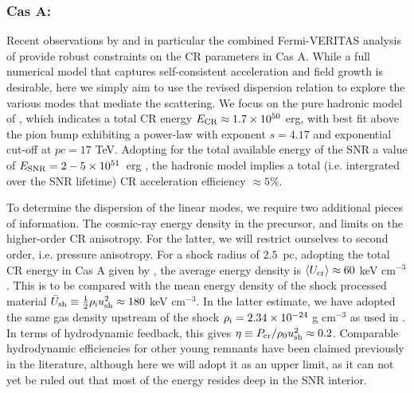 \documentclass[a4paper,fleqn,usenatbib]{mnras}
\begin{document}
\subsubsection*{Cas A:}

Recent observations by \cite{CasAMAGIC} and in particular the combined Fermi-VERITAS analysis of \cite{CasAVeritas} provide robust constraints on the CR parameters in Cas A. While a full numerical model that captures self-consistent acceleration and field growth is desirable, here we simply aim to use the revised dispersion relation to explore the various modes that mediate the scattering. We focus on the pure hadronic model of \citet{CasAVeritas}, which indicates a total CR energy $E_{\rm CR} \approx 1.7 \times 10^{50}$ erg, with best fit above the pion bump exhibiting a power-law with exponent $s=4.17$ and exponential cut-off at $pc=17$ TeV. Adopting for the total available energy of the SNR a value of $E_{\rm SNR} = 2-5 \times 10^{51}$~erg \citep{ChevalierOishi}, the hadronic model implies a total (i.e. intergrated over the SNR lifetime) CR acceleration efficiency $\approx 5\%$. 

To determine the dispersion of the linear modes, we require two additional pieces of information. The cosmic-ray energy density in the precursor, and limits on the higher-order CR anisotropy. For the latter, we will restrict ourselves to second order, i.e. pressure anisotropy.
For a shock radius of $2.5$~pc, adopting the total CR energy in Cas A given by \citet{CasAVeritas}, the average energy density is $\left\langle U_{\rm cr}\right\rangle \approx 60$ keV cm$^{-3}$. This is to be compared with the mean energy density of the shock processed material $\bar{U}_{\rm sh} \equiv \frac{1}{2} \rho_{\rm i} u_{\rm sh}^2 \approx 180$ keV cm$^{-3}$. In the latter estimate, we have adopted the same gas density upstream of the shock $\rho_{\rm i} = 2.34\times 10^{-24}$ g  cm$^{-3}$  as used in \citet{CasAVeritas}. In terms of hydrodynamic feedback, this gives $\eta \equiv P_{\rm cr}/\rho_0 u_{\rm sh}^2 \approx 0.2$. Comparable hydrodynamic efficiencies for other young remnants have been claimed previously in the literature, although here we will adopt it as an upper limit, as it can not yet be ruled out that  most of the energy resides deep in the SNR interior. 
\end{document}
